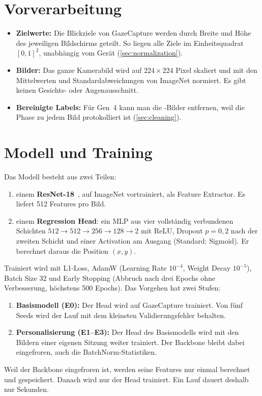 \section{Vorverarbeitung}
\label{sec:meth_vorverarbeitung}
\begin{itemize}
  \item \textbf{Zielwerte:} Die Blickziele von GazeCapture werden durch Breite
        und Höhe des jeweiligen Bildschirms geteilt. So liegen alle Ziele im
        Einheitsquadrat $[0,1]^2$, unabhängig vom Gerät
        (\cref{sec:normalization}).
  \item \textbf{Bilder:} Das ganze Kamerabild wird auf
        $224\times224$ Pixel skaliert und mit den Mittelwerten und
        Standardabweichungen von ImageNet normiert. Es gibt keinen Gesichts-
        oder Augenausschnitt.
  \item \textbf{Bereinigte Labels:} Für Gen~4 kann man die -Bilder
        entfernen, weil die Phase zu jedem Bild protokolliert ist
        (\cref{sec:cleaning}).
\end{itemize}

\section{Modell und Training}
\label{sec:meth_modell}
Das Modell besteht aus zwei Teilen:
\begin{enumerate}
  \item einem \textbf{ResNet-18}~\cite{he2016resnet}, auf ImageNet
        vortrainiert, als Feature Extractor. Es liefert 512 Features pro Bild.
  \item einem \textbf{Regression Head}: ein MLP aus vier vollständig
        verbundenen Schichten $512 \to 512 \to 256 \to 128 \to 2$ mit ReLU,
        Dropout $p=0,2$ nach der zweiten Schicht und einer Activation am
        Ausgang (Standard: Sigmoid). Er berechnet daraus die Position $(x,y)$.
\end{enumerate}
Trainiert wird mit L1-Loss, AdamW (Learning Rate $10^{-4}$,
Weight Decay $10^{-5}$), Batch Size 32 und Early Stopping (Abbruch nach drei
Epochs ohne Verbesserung, höchstens 500 Epochs). Das Vorgehen hat zwei Stufen:
\begin{enumerate}
  \item \textbf{Basismodell (E0):} Der Head wird auf GazeCapture trainiert.
        Von fünf Seeds wird der Lauf mit dem kleinsten
        Validierungsfehler behalten.
  \item \textbf{Personalisierung (E1--E3):} Der Head des Basismodells wird mit
        den Bildern einer eigenen Sitzung weiter trainiert. Der Backbone bleibt dabei eingefroren,
        auch die BatchNorm-Statistiken.
\end{enumerate}
Weil der Backbone eingefroren ist, werden seine Features nur einmal berechnet
und gespeichert. Danach wird nur der Head trainiert. Ein Lauf
dauert deshalb nur Sekunden.

